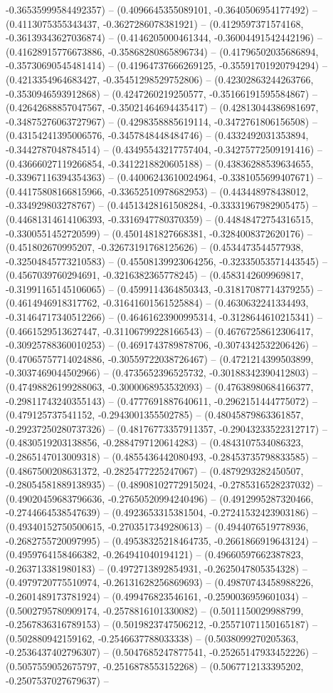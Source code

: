 -0.36535999584492357) -- (0.4096645355089101, -0.3640506954177492) -- (0.4113075355343437, -0.3627286078381921) -- (0.4129597371574168, -0.36139343627036874) -- (0.4146205000461344, -0.36004491542442196) -- (0.41628915776673886, -0.35868280865896734) -- (0.41796502035686894, -0.35730690545481414) -- (0.41964737666269125, -0.35591701920794294) -- (0.4213354964683427, -0.35451298529752806) -- (0.42302863244263766, -0.3530946593912868) -- (0.4247260219250577, -0.35166191595584867) -- (0.42642688857047567, -0.35021464694435417) -- (0.42813044386981697, -0.34875276063727967) -- (0.4298358885619114, -0.3472761806156508) -- (0.43154241395006576, -0.3457848448484746) -- (0.4332492031353894, -0.3442787048784514) -- (0.43495543217757404, -0.34275772509191416) -- (0.43666027119266854, -0.3412218820605188) -- (0.43836288539634655, -0.33967116394354363) -- (0.44006243610024964, -0.3381055699407671) -- (0.44175808166815966, -0.33652510978682953) -- (0.443448978438012, -0.334929803278767) -- (0.44513428161508284, -0.33331967982905475) -- (0.44681314614106393, -0.3316947780370359) -- (0.44848472754316515, -0.3300551452720599) -- (0.4501481827668381, -0.3284008372620176) -- (0.451802670995207, -0.32673191768125626) -- (0.4534473544577938, -0.32504845773210583) -- (0.45508139923064256, -0.32335053571443545) -- (0.4567039760294691, -0.3216382365778245) -- (0.4583142609969817, -0.31991165145106065) -- (0.4599114364850343, -0.31817087714379255) -- (0.4614946918317762, -0.31641601561525884) -- (0.4630632241334493, -0.31464717340512266) -- (0.46461623900995314, -0.3128644610215341) -- (0.4661529513627447, -0.31106799228166543) -- (0.46767258612306417, -0.30925788360010253) -- (0.4691743789878706, -0.3074342532206426) -- (0.47065757714024886, -0.30559722038726467) -- (0.4721214399503899, -0.3037469044502966) -- (0.4735652396525732, -0.30188342390412803) -- (0.47498826199288063, -0.3000068953532093) -- (0.47638980684166377, -0.29811743240355143) -- (0.4777691887640611, -0.2962151444775072) -- (0.479125737541152, -0.2943001355502785) -- (0.48045879863361857, -0.29237250280737326) -- (0.48176773357911357, -0.29043233522312717) -- (0.4830519203138856, -0.2884797120614283) -- (0.4843107534086323, -0.2865147013009318) -- (0.4855436442080493, -0.28453735798833585) -- (0.4867500208631372, -0.2825477225247067) -- (0.4879293282450507, -0.28054581889138935) -- (0.48908102772915024, -0.2785316528237032) -- (0.49020459683796636, -0.27650520994240496) -- (0.4912995287320466, -0.2744664538547639) -- (0.4923653315381504, -0.27241532423903186) -- (0.49340152750500615, -0.2703517349280613) -- (0.4944076519778936, -0.2682755720097995) -- (0.49538325218464735, -0.2661866919643124) -- (0.4959764158466382, -0.264941040194121) -- (0.49660597662387823, -0.263713381980183) -- (0.4972713892854931, -0.2625047805354328) -- (0.4979720775510974, -0.26131628256869693) -- (0.49870743458988226, -0.2601489173781924) -- (0.499476823546161, -0.2590036959601034) -- (0.5002795780909174, -0.2578816101330082) -- (0.5011150029988799, -0.2567836316789153) -- (0.5019823747506212, -0.25571071150165187) -- (0.502880942159162, -0.2546637788033338) -- (0.5038099270205363, -0.2536437402796307) -- (0.5047685247877541, -0.25265147933452226) -- (0.5057559052675797, -0.2516878553152268) -- (0.5067712133395202, -0.2507537027679637) -- 